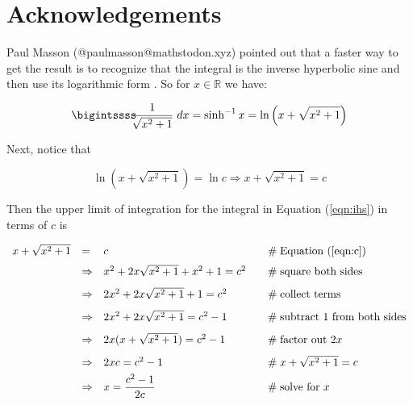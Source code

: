 \documentclass{article}
\theoremstyle{definition}
\begin{document}
\section*{Acknowledgements}
Paul Masson (@paulmasson@mathstodon.xyz) pointed out that a faster way to 
get the result is to recognize that the integral is the inverse hyperbolic 
sine and then use its logarithmic form \cite{inverse_hyperbolic_sine}. So 
for $x \in \mathbb{R}$ we have:

\bigskip
\begin{equation}
\bigintssss \hspace{-0.5em}  \dfrac{1}{\sqrt{x^{2} + 1}} \; dx = \sinh^{-1} x = 
\ln \left (x + \sqrt{x^{2} + 1} \right )
\label{eqn:ihs}
\end{equation}

\bigskip
\noindent
Next, notice that 


\begin{equation}
\ln \left (x + \sqrt{x^{2} + 1} \right ) = \ln c \Rightarrow x + \sqrt{x^{2} + 1} = c
\label{eqn:c}
\end{equation}


\bigskip
\noindent
Then the upper limit of integration for the integral
in Equation (\ref{eqn:ihs}) in terms of $c$ is

\medskip
\begin{equation*}
\begin{array}{llll}
x + \sqrt{x^{2} + 1} 
&=& c &\hspace{1em} \mathrel{\#} \text{Equation (\ref{eqn:c})} \\
[6pt]
&\Rightarrow& x^2 + 2x\sqrt{x^2+1} + x^2+1= c^2 
			&\hspace{1em} \mathrel{\#} \text{square both sides} \\
[8pt]
&\Rightarrow& 2x^2 + 2x\sqrt{x^2+1} + 1 = c^2 
			&\hspace{1em} \mathrel{\#} \text{collect terms} \\
[8pt]
&\Rightarrow& 2x^2 + 2x\sqrt{x^2+1} = c^2 -1  
			&\hspace{1em} \mathrel{\#} \text{subtract 1 from both sides} \\
[8pt]
&\Rightarrow& 2x (x + \sqrt{x^2+1}) = c^2 -1  
			&\hspace{1em} \mathrel{\#} \text{factor out $2x$} \\
[8pt]
&\Rightarrow& 2xc = c^2 -1  
			&\hspace{1em} \mathrel{\#} x + \sqrt{x^{2}+1} = c \\
[4pt]
&\Rightarrow& x = \dfrac{c^2 -1}{2c}  
			&\hspace{1em} \mathrel{\#} \text{solve for $x$} \\
\end{array}
\end{equation*}
\end{document}

